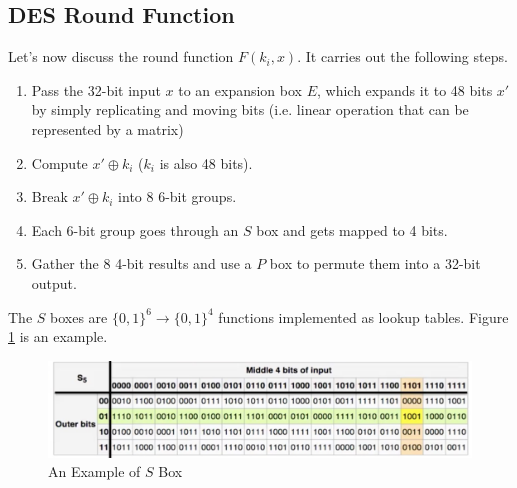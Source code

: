 \subsection{DES Round Function}
Let's now discuss the round function $F(k_i,x)$. It carries out the following steps.
\begin{enumerate}
\item Pass the 32-bit input $x$ to an expansion box $E$, which expands it to 48 bits $x'$ by simply replicating and moving bits (i.e. linear operation that can be represented by a matrix)
\item Compute $x'\oplus k_i$ ($k_i$ is also 48 bits).
\item Break $x'\oplus k_i$ into 8 6-bit groups.
\item Each 6-bit group goes through an $S$ box and gets mapped to 4 bits.
\item Gather the 8 4-bit results and use a $P$ box to permute them into a 32-bit output.  
\end{enumerate}

The $S$ boxes are $\{0,1\}^6\rightarrow\{0,1\}^4$ functions implemented as lookup tables. Figure \ref{sboxeg} is an example.
\begin{figure}[ht]
\centering
\includegraphics[width=\textwidth]{sboxeg.jpg}
\caption{An Example of $S$ Box}\label{sboxeg}
\end{figure}

